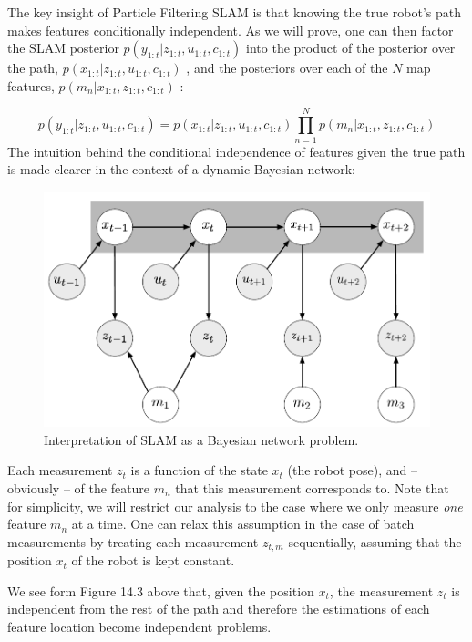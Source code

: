 \documentclass[twoside]{article}
\begin{document}
The key insight of Particle Filtering SLAM is that knowing the true robot's path makes features conditionally independent. As we will prove, one can then factor the SLAM posterior $p(y_{1:t}|z_{1:t},u_{1:t},c_{1:t})$ into the product of the posterior over the path,  $p(x_{1:t}|z_{1:t},u_{1:t},c_{1:t})$ , and the posteriors over each of the $N$ map features, $p(m_n|x_{1:t},z_{1:t},c_{1:t})$ :

\begin{equation}
p(y_{1:t}|z_{1:t},u_{1:t},c_{1:t}) = p(x_{1:t}|z_{1:t},u_{1:t},c_{1:t})\prod_{n=1}^Np(m_n|x_{1:t},z_{1:t},c_{1:t})\nonumber
\end{equation}
The intuition behind the conditional independence of features given the true path is made clearer in the context of a dynamic Bayesian network:

\begin{figure}[H]
\centering
\includegraphics[scale=0.5]{fastSLAM_fig1}
\caption{Interpretation of SLAM as a Bayesian network problem.}
\end{figure}


Each measurement $z_t$ is a function of the state $x_t$ (the robot pose), and -- obviously -- of the feature $m_n$ that this measurement corresponds to. Note that for simplicity, we will restrict our analysis to the case where we only measure \textit{one} feature $m_n$ at a time. One can relax this assumption in the case of batch measurements by treating each measurement $z_{t,m}$ sequentially, assuming that the position $x_t$ of the robot is kept constant.

We see form Figure 14.3 above that, given the position $x_t$, the measurement $z_t$ is independent from the rest of the path and therefore the estimations of each feature location become independent problems.
\end{document}
